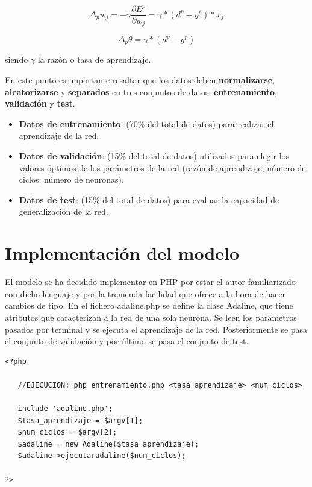 \documentclass[11pt,spanish,listoffigures,listoftables]{workluis}
\begin{document}
\begin{equation}\label{eq:ej4}
\Delta_{p}w_{j} = -\gamma\frac{\partial E^{p}}{\partial w_{j}} = \gamma*(d^{p} - y^{p})*x_{j}
\end{equation} 

\begin{equation}\label{eq:ej5}
\Delta_{p}\theta = \gamma*(d^{p} - y^{p})
\end{equation}

\par siendo $\gamma$ la razón o tasa de aprendizaje.

\par En este punto es importante resaltar que los datos deben \textbf{normalizarse}, \textbf{aleatorizarse} y \textbf{separados} en tres conjuntos de datos: \textbf{entrenamiento}, \textbf{validación} y \textbf{test}.

\begin{itemize}
\item \textbf{Datos de entrenamiento}: (70\%  del  total  de  datos) para  realizar  el aprendizaje de la red. 
\item \textbf{Datos de validación}: (15\%  del  total  de  datos) utilizados para elegir los  valores  óptimos  de los parámetros  de  la  red  (razón  de aprendizaje, número de ciclos, número de neuronas).
\item \textbf{Datos de test}: (15\%  del  total  de  datos) para evaluar la capacidad de generalización de la red.
\end{itemize}

\section{Implementación del modelo}

\par El modelo se ha decidido implementar en PHP por estar el autor familiarizado con dicho lenguaje y por la tremenda facilidad que ofrece a la hora de hacer cambios de tipo. En el fichero adaline.php se define la clase Adaline, que tiene atributos que caracterizan a la red de una sola neurona. Se leen los parámetros pasados por terminal y se ejecuta el aprendizaje de la red. Posteriormente se pasa el conjunto de validación y por último se pasa el conjunto de test.

\begin{lstlisting}
<?php

   //EJECUCION: php entrenamiento.php <tasa_aprendizaje> <num_ciclos>

   include 'adaline.php';
   $tasa_aprendizaje = $argv[1];
   $num_ciclos = $argv[2];
   $adaline = new Adaline($tasa_aprendizaje);
   $adaline->ejecutaradaline($num_ciclos);

?>
\end{lstlisting}
\end{document}

